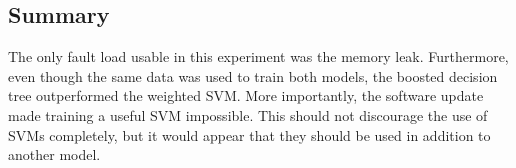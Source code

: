 \subsection{Summary}
The only fault load usable in this experiment was the memory leak.
Furthermore, even though the same data was used to train both models, the
boosted decision tree outperformed the weighted \ac{SVM}.  More importantly,
the software update made training a useful \ac{SVM} impossible.  This should
not discourage the use of \ac{SVM}s completely, but it would appear that they
should be used in addition to another model.

